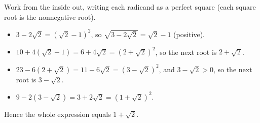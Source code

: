 Work from the inside out, writing each radicand as a perfect square (each square root is the nonnegative root).
\begin{itemize}
\item $3-2\sqrt2=\left(\sqrt2-1\right)^2$, so $\sqrt{3-2\sqrt2}=\sqrt2-1$ (positive).
\item $10+4\left(\sqrt2-1\right)=6+4\sqrt2=\left(2+\sqrt2\right)^2$, so the next root is $2+\sqrt2$.
\item $23-6\left(2+\sqrt2\right)=11-6\sqrt2=\left(3-\sqrt2\right)^2$, and $3-\sqrt2>0$, so the next root is $3-\sqrt2$.
\item $9-2\left(3-\sqrt2\right)=3+2\sqrt2=\left(1+\sqrt2\right)^2$.
\end{itemize}
Hence the whole expression equals $\boxed{1+\sqrt2}$.
